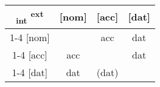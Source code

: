 
\begin{tabular}{c|c|c|c}
  \toprule
      \textsubscript{\ac{int}} \textsuperscript{\ac{ext}}
        & [\ac{nom}]
        & [\ac{acc}]
        & [\ac{dat}]
        \\ \cmidrule{1-4}
    [\ac{nom}]
        &
        & \ac{acc}
        & \ac{dat}
        \\ \cmidrule{1-4}
    [\ac{acc}]
        & \ac{acc}
        &
        & \ac{dat}
        \\ \cmidrule{1-4}
    [\ac{dat}]
        & \ac{dat}
        & (\ac{dat})
        &
        \\
  \bottomrule
\end{tabular}
